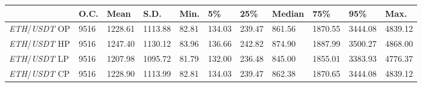 \begin{tabular}{lllllllllll}
\toprule
 & \textbf{O.C.} & \textbf{Mean} & \textbf{S.D.} & \textbf{Min.} & \textbf{5\%} & \textbf{25\%} & \textbf{Median} & \textbf{75\%} & \textbf{95\%} & \textbf{Max.} \\
\midrule
\emph{ETH}/\emph{USDT} OP & 9516 & 1228.61 & 1113.88 & 82.81 & 134.03 & 239.47 & 861.56 & 1870.55 & 3444.08 & 4839.12 \\
\emph{ETH}/\emph{USDT} HP & 9516 & 1247.40 & 1130.12 & 83.96 & 136.66 & 242.82 & 874.90 & 1887.99 & 3500.27 & 4868.00 \\
\emph{ETH}/\emph{USDT} LP & 9516 & 1207.98 & 1095.72 & 81.79 & 132.00 & 236.48 & 845.00 & 1855.01 & 3383.93 & 4776.37 \\
\emph{ETH}/\emph{USDT} CP & 9516 & 1228.90 & 1113.99 & 82.81 & 134.03 & 239.47 & 862.38 & 1870.65 & 3444.08 & 4839.12 \\
\bottomrule
\end{tabular}
